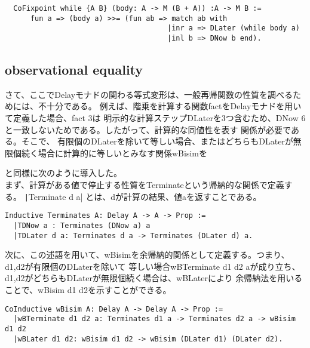 \documentclass[japanese]{jssst_ppl}
\theoremstyle{definition}
\begin{document}
\begin{verbatim}
  CoFixpoint while {A B} (body: A -> M (B + A)) :A -> M B :=
      fun a => (body a) >>= (fun ab => match ab with
                                      |inr a => DLater (while body a)
                                      |inl b => DNow b end).
\end{verbatim}




\subsection{observational equality}
さて、ここでDelayモナドの関わる等式変形は、一般再帰関数の性質を調べるためには、不十分である。
例えば、階乗を計算する関数factをDelayモナドを用いて定義した場合、fact 3は
明示的な計算ステップDLaterを3つ含むため、DNow 6と一致しないためである。したがって、計算的な同値性を表す
関係が必要である。そこで、
有限個のDLaterを除いて等しい場合、またはどちらもDLaterが無限個続く場合に計算的に等しいとみなす関係wBisimを


\cite{lmcs:2265}と同様に次のように導入した。\\


まず、計算がある値で停止する性質をTerminateという帰納的な関係で定義する。
\texttt|Terminate d a| とは、dが計算の結果、値aを返すことである。\\
\begin{verbatim}
Inductive Terminates A: Delay A -> A -> Prop :=
  |TDNow a : Terminates (DNow a) a
  |TDLater d a: Terminates d a -> Terminates (DLater d) a.
\end{verbatim}
次に、この述語を用いて、wBisimを余帰納的関係として定義する。つまり、d1,d2が有限個のDLaterを除いて
等しい場合wBTerminate d1 d2 aが成り立ち、d1,d2がどちらもDLaterが無限個続く場合は、wBLaterにより
余帰納法を用いることで、wBisim d1 d2を示すことができる。
\begin{verbatim}
CoInductive wBisim A: Delay A -> Delay A -> Prop :=
  |wBTerminate d1 d2 a: Terminates d1 a -> Terminates d2 a -> wBisim d1 d2
  |wBLater d1 d2: wBisim d1 d2 -> wBisim (DLater d1) (DLater d2).
\end{verbatim}
\end{document}

